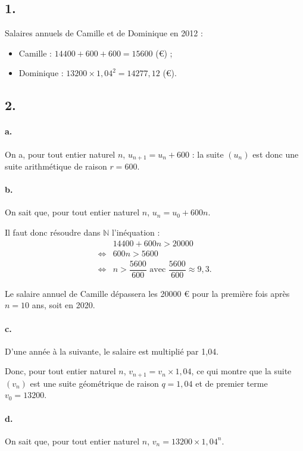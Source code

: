 \subsection*{1.}

Salaires annuels de Camille et de Dominique en 2012 :
\begin{itemize}
    \item Camille : \(14400 + 600 + 600 = 15600\) (€) ;
    \item Dominique : \(13200 \times 1{,}04^2 = 14277{,}12\) (€).
\end{itemize}

\subsection*{2.}

\paragraph{a.} On a, pour tout entier naturel \( n \), \( u_{n+1} = u_n + 600 \) : la suite \( (u_n) \) est donc une suite arithmétique de raison \(r = 600\).

\paragraph{b.} On sait que, pour tout entier naturel \( n \), \( u_n = u_0 + 600n \).

Il faut donc résoudre dans \( \mathbb{N} \) l'inéquation :
\begin{align*}
&14400 + 600n > 20000 \\
\iff &600n > 5600 \\
\iff &n > \dfrac{5600}{600} \text{ avec } \dfrac{5600}{600} \approx 9{,}3.
\end{align*}

Le salaire annuel de Camille dépassera les 20000 € pour la première fois après \(n = 10\) ans, soit en 2020.

\paragraph{c.} D'une année à la suivante, le salaire est multiplié par 1{,}04.

Donc, pour tout entier naturel \( n \), \( v_{n+1} = v_n \times 1{,}04 \), ce qui montre que la suite \( (v_n) \) est une suite géométrique de raison \(q = 1{,}04\) et de premier terme \( v_0 = 13200 \).

\paragraph{d.} On sait que, pour tout entier naturel \( n \), \( v_n = 13200 \times 1{,}04^n \).

